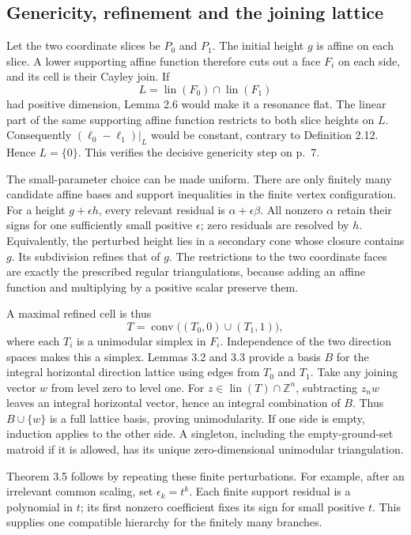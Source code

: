 \documentclass[10pt]{article}
\begin{document}
\subsection*{Genericity, refinement and the joining lattice}
Let the two coordinate slices be \(P_0\) and \(P_1\). The initial height \(g\) is affine on each slice. A lower supporting affine function therefore cuts out a face \(F_i\) on each side, and its cell is their Cayley join. If \[L=\operatorname{lin}(F_0)\cap\operatorname{lin}(F_1)\] had positive dimension, Lemma 2.6 would make it a resonance flat. The linear part of the same supporting affine function restricts to both slice heights on \(L\). Consequently \((\ell_0-\ell_1)|_L\) would be constant, contrary to Definition 2.12. Hence \(L=\{0\}\). This verifies the decisive genericity step on p. 7.\par
The small-parameter choice can be made uniform. There are only finitely many candidate affine bases and support inequalities in the finite vertex configuration. For a height \(g+\epsilon h\), every relevant residual is \(\alpha+\epsilon\beta\). All nonzero \(\alpha\) retain their signs for one sufficiently small positive \(\epsilon\); zero residuals are resolved by \(h\). Equivalently, the perturbed height lies in a secondary cone whose closure contains \(g\). Its subdivision refines that of \(g\). The restrictions to the two coordinate faces are exactly the prescribed regular triangulations, because adding an affine function and multiplying by a positive scalar preserve them.\par
A maximal refined cell is thus \[T=\operatorname{conv}\bigl((T_0,0)\cup(T_1,1)\bigr),\] where each \(T_i\) is a unimodular simplex in \(F_i\). Independence of the two direction spaces makes this a simplex. Lemmas 3.2 and 3.3 provide a basis \(B\) for the integral horizontal direction lattice using edges from \(T_0\) and \(T_1\). Take any joining vector \(w\) from level zero to level one. For \(z\in\operatorname{lin}(T)\cap\mathbb Z^n\), subtracting \(z_nw\) leaves an integral horizontal vector, hence an integral combination of \(B\). Thus \(B\cup\{w\}\) is a full lattice basis, proving unimodularity. If one side is empty, induction applies to the other side. A singleton, including the empty-ground-set matroid if it is allowed, has its unique zero-dimensional unimodular triangulation.\par
Theorem 3.5 follows by repeating these finite perturbations. For example, after an irrelevant common scaling, set \(\epsilon_k=t^k\). Each finite support residual is a polynomial in \(t\); its first nonzero coefficient fixes its sign for small positive \(t\). This supplies one compatible hierarchy for the finitely many branches.\par
\end{document}
